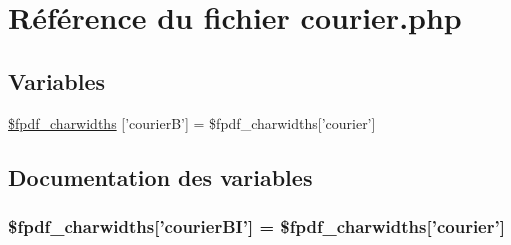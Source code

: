 \hypertarget{courier_8php}{
\section{R\'{e}f\'{e}rence du fichier courier.php}
\label{courier_8php}
}
\subsection*{Variables}
\begin{CompactItemize}
\item 
\hyperlink{courier_8php_a0}{\$fpdf\_\-charwidths} \mbox{[}'courier\-B'\mbox{]} = \$fpdf\_\-charwidths\mbox{[}'courier'\mbox{]}
\end{CompactItemize}


\subsection{Documentation des variables}
\hypertarget{courier_8php_a0}{
\subsubsection[\$fpdf\_\-charwidths]{\setlength{\rightskip}{0pt plus 5cm}\$fpdf\_\-charwidths\mbox{[}'courier\-BI'\mbox{]} = \$fpdf\_\-charwidths\mbox{[}'courier'\mbox{]}}}
\label{courier_8php_a0}


